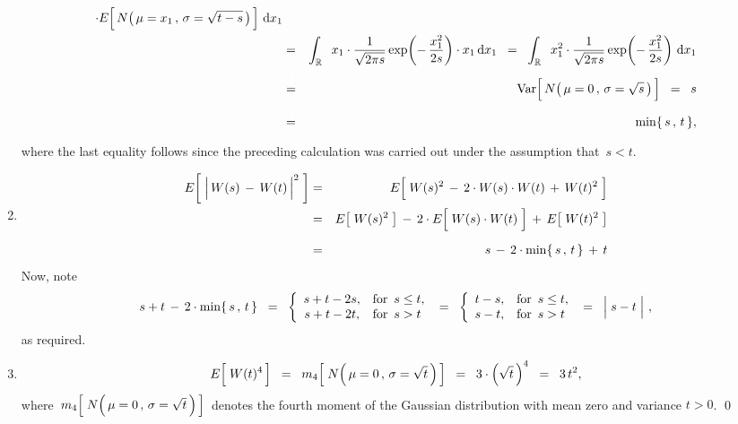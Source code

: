 \begin{enumerate}
\begin{eqnarray*}
			\cdot
			E\!\left[\,\overset{{\color{white}.}}{N}\!\left(\,\mu=x_{1}\,,\,\sigma=\sqrt{t-s}\,\right)\,\right]
			\,\d x_{1}
	\\
	& = &
		\int_{\Re}\;\;
			x_{1} \cdot
			\dfrac{1}{\sqrt{2\pi s}}\exp\!\left(-\,\dfrac{x_{1}^{2}}{2s}\right)
			\cdot
			x_{1}
			\,\d x_{1}
	\;\; = \;\;
		\int_{\Re}\;\;
			x_{1}^{2} \cdot
			\dfrac{1}{\sqrt{2\pi s}}\exp\!\left(-\,\dfrac{x_{1}^{2}}{2s}\right)
			\,\d x_{1}
	\\
	& \overset{{\color{white}\textnormal{\LARGE$1$}}}{=} &
		\Var\!\left[\,\overset{{\color{white}.}}{N}\!\left(\,\mu=0\,,\,\sigma=\sqrt{s}\,\right)\,\right]
	\;\; = \;\;
		s
	\\
	& \overset{{\color{white}\textnormal{\Large$1$}}}{=} &
		\min\{\,s\,,\,t\,\},
	\end{eqnarray*}
	where the last equality follows since the preceding calculation
	was carried out under the assumption that \,$s < t$.
\item
	\begin{eqnarray*}
	E\!\left[\;\left\vert\,\overset{{\color{white}.}}{W(s)}\,-\,W(t)\,\right\vert^{2}\;\right]
	& = &
		E\!\left[\;
			W(s)^{2}
			\,-\,
			2 \cdot \overset{{\color{white}.}}{W(s)} \cdot W(t)
			\,+\,
			W(t)^{2}
			\;\right]
	\\
	& = &
		E\!\left[\;W(s)^{2}\;\right]
		\,-\,
		2 \cdot E\!\left[\;\overset{{\color{white}.}}{W(s)} \cdot W(t)\;\right]
		\,+\,
		E\!\left[\;W(t)^{2}\;\right]
	\\
	& \overset{{\color{white}\textnormal{\large$1$}}}{=} &
		s \,-\, 2 \cdot \min\{\,s\,,\,t\,\} \,+\, t
	\end{eqnarray*}
	Now, note
	\begin{equation*}
	s + t \,-\, 2 \cdot \min\{\,s\,,\,t\,\}
	\;\; = \;\;
		\left\{\begin{array}{cl}
			s + t - 2s, & \textnormal{for \,$s \leq t$},
			\\ 
			s + t - 2t, & \textnormal{for \,$s > t$} 
			\end{array}\right.
	\; = \;\;
		\left\{\begin{array}{cl}
			t - s, & \textnormal{for \,$s \leq t$},
			\\ 
			s - t, & \textnormal{for \,$s > t$} 
			\end{array}\right.
	\; = \;\;
		\left\vert\; s \overset{{\color{white}.}}{-} t \;\right\vert\,,
	\end{equation*}
	as required.

\item
	\begin{equation*}
	E\!\left[\; W(\overset{{\color{white}.}}{t})^{4} \,\right]
	\;\; = \;\;
		m_{4}\!\left[\; N\!\left(\,\overset{{\color{white}.}}{\mu = 0}\,,\,\sigma = \sqrt{t}\,\right) \,\right]
	\;\; = \;\;
		3\cdot\left(\sqrt{t}\,\right)^{4}
	\;\; = \;\;
		3\,t^{2},
	\end{equation*}
	where
	\,$m_{4}\!\left[\; N\!\left(\,\overset{{\color{white}.}}{\mu = 0}\,,\,\sigma = \sqrt{t}\,\right) \,\right]$\,
	denotes the fourth moment of the Gaussian distribution with mean zero and variance $t > 0$.
	\qed
\end{enumerate}

